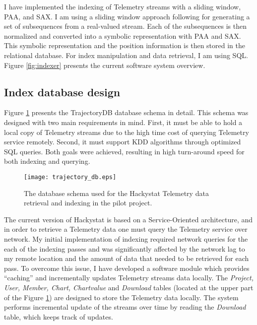 I have implemented the indexing of Telemetry streams with a sliding window, PAA, and SAX. I am using a sliding window approach following \cite{citeulike:2821475} for generating a set of subsequences from a real-valued stream. Each of the subsequences is then normalized and converted into a symbolic representation with PAA and SAX. This symbolic representation and the position information is then stored in the relational database. For index manipulation and data retrieval, I am using SQL. Figure \ref{fig:indexer} presents the current software system overview.

\subsection{Index database design} \label{indexing_design}
Figure \ref{fig:trajectory_db} presents the TrajectoryDB database schema in detail. This schema was designed with two main requirements in mind. First, it must be able to hold a local copy of Telemetry streams due to the high time cost of querying Telemetry service remotely. Second, it must support KDD algorithms through optimized SQL queries. Both goals were achieved, resulting in high turn-around speed for both indexing and querying.

\begin{figure}[tbp]
   \centering
   \texttt{[image: trajectory\_db.eps]}
   \caption{The database schema used for the Hackystat Telemetry data retrieval and indexing in the pilot project.}
   \label{fig:trajectory_db}
\end{figure}

The current version of Hackystat is based on a Service-Oriented architecture, and in order to retrieve a Telemetry data one must query the Telemetry service over network. My initial implementation of indexing required network queries for the each of the indexing passes and was significantly affected by the network lag to my remote location and the amount of data that needed to be retrieved for each pass. To overcome this issue, I have developed a software module which provides ``caching'' and incrementally updates Telemetry streams data locally. The \textit{Project, User, Member, Chart, Chartvalue} and \textit{Download} tables (located at the upper part of the Figure \ref{fig:trajectory_db}) are designed to store the Telemetry data locally. The system performs incremental update of the streams over time by reading the \textit{Download} table, which keeps track of updates.

